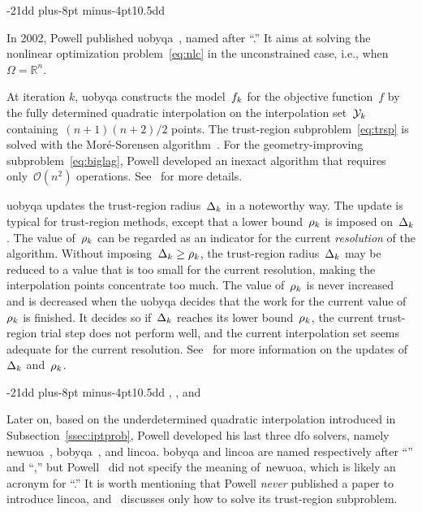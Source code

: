 \documentclass[smallextended,final]{svjour3}
\makeatletter
\newcommand{\R}{\mathbb{R}}
\newcommand{\fset}{\Omega}
\newcommand{\objm}[1][k]{\obj\ifthenelse{\equal{#1}{}}{}{_{#1}}}
\newcommand{\obj}{f}
\newcommand{\radlb}[1][k]{\rho\ifthenelse{\equal{#1}{}}{}{_{#1}}}
\newcommand{\rad}[1][k]{\Delta\ifthenelse{\equal{#1}{}}{}{_{#1}}}
\newcommand{\xpt}[1][k]{\mathcal{Y}\ifthenelse{\equal{#1}{}}{}{_{#1}}}
\def\subsection{\@startsection{subsection}{2}{\z@}%
    {-21dd plus-8pt minus-4pt}{10.5dd}
    {\normalsize\bfseries}}
\makeatother
\begin{document}
\subsection{}
\label{ssec:uobyqa}

In 2002, Powell published \gls{uobyqa}~\cite{Powell_2002}, named after ``.''
It aims at solving the nonlinear optimization problem~\eqref{eq:nlc} in the unconstrained case, i.e., when~$\fset = \R^n$.

At iteration $k$, \gls{uobyqa} constructs the model~$\objm$ for the objective function~$\obj$ by the fully determined quadratic interpolation on the interpolation set~$\xpt$ containing~$(n + 1)(n + 2) / 2$ points.
The trust-region subproblem~\eqref{eq:trsp} is solved with the Mor{\'{e}}-Sorensen algorithm~\cite{More_Sorensen_1983}.
For the geometry-improving subproblem~\eqref{eq:biglag}, Powell developed an inexact algorithm that requires only~$\mathcal{O}(n^2)$ operations.
See~\cite[\S~2]{Powell_2002} for more details.

\Gls{uobyqa} updates the trust-region radius~$\rad$ in a noteworthy way.
The update is typical for trust-region methods, except that a lower bound~$\radlb$ is imposed on~$\rad$.
The value of~$\radlb[k]$ can be regarded as an indicator for the current \emph{resolution} of the algorithm.
Without imposing~$\rad[k] \ge \radlb[k]$, the trust-region radius~$\rad[k]$ may be reduced to a value that is too small for the current resolution, making the interpolation points concentrate too much.
The value of~$\radlb[k]$ is never increased and is decreased when the \gls{uobyqa} decides that the work for the current value of~$\radlb[k]$ is finished.
It decides so if~$\rad[k]$ reaches its lower bound~$\radlb[k]$, the current trust-region trial step does not perform well, and the current interpolation set seems adequate for the current resolution.
See~\cite[\S~3]{Powell_2002} for more information on the updates of~$\rad$ and~$\radlb[k]$.

\subsection{, , and }
\label{ssec:nbloa}

Later on, based on the underdetermined quadratic interpolation introduced in Subsection~\ref{ssec:iptprob}, Powell developed his last three \gls{dfo} solvers, namely \gls{newuoa}~\cite{Powell_2006,Powell_2008}, \gls{bobyqa}~\cite{Powell_2009}, and \gls{lincoa}.
\Gls{bobyqa} and \gls{lincoa} are named respectively after ``'' and ``,'' but Powell~\cite{Powell_2006,Powell_2008} did not specify the meaning of~\gls{newuoa}, which is likely an acronym for ``.''
It is worth mentioning that Powell \emph{never} published a paper to introduce \gls{lincoa}, and~\cite{Powell_2015} discusses only how to solve its trust-region subproblem.
\end{document}
